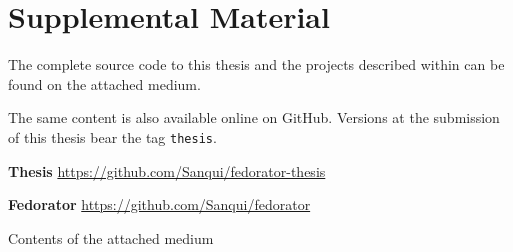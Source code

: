 \chapter{Supplemental Material}

The complete source code to this thesis and the projects described within can be found on the attached medium.  

The same content is also available online on GitHub.  Versions at the submission of this thesis bear the tag \texttt{thesis}.

\noindent \textbf{Thesis} \hfill
    \url{https://github.com/Sanqui/fedorator-thesis}

\noindent \textbf{Fedorator} \hfill
    \url{https://github.com/Sanqui/fedorator}

\vfill

\begin{dirfigure}%
\caption{Contents of the attached medium}
\end{dirfigure}
